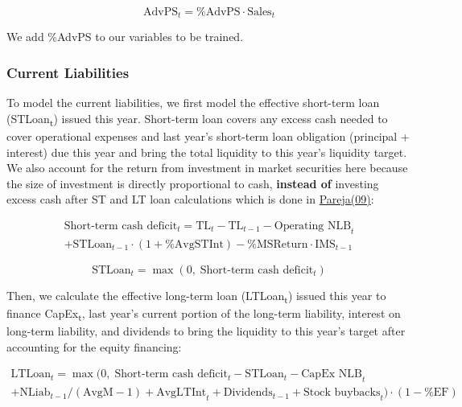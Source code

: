 \documentclass[12pt,a4paper]{article}
\begin{document}
\begin{equation}\label{eq:advps}
\text{AdvPS}_t = \text{\%AdvPS} \cdot \text{Sales}_t
\end{equation}

We add \%AdvPS to our variables to be trained.

\subsubsection{Current Liabilities}

To model the current liabilities, we first model the effective
short-term loan (STLoan\textsubscript{t}) issued this year. Short-term
loan covers any excess cash needed to cover operational expenses and
last year's short-term loan obligation (principal + interest) due this
year and bring the total liquidity to this year's liquidity target. We
also account for the return from investment in market securities here
because the size of investment is directly proportional to cash,
\textbf{instead of} investing excess cash after ST and LT loan
calculations which is done in \hyperlink{ref:pareja09}{Pareja(09)}:

\begin{multline}\label{eq:st_cash_deficit}
\text{Short-term cash deficit}_t = \text{TL}_t - \text{TL}_{t-1} - \text{Operating NLB}_t \\
+ \text{STLoan}_{t-1} \cdot (1 + \text{\%AvgSTInt}) - \text{\%MSReturn} \cdot \text{IMS}_{t-1}
\end{multline}

\begin{equation}\label{eq:stloan}
\text{STLoan}_t = \max(0,\; \text{Short-term cash deficit}_t)
\end{equation}

Then, we calculate the effective long-term loan
(LTLoan\textsubscript{t}) issued this year to finance
CapEx\textsubscript{t}, last year's current portion of the long-term
liability, interest on long-term liability, and dividends to bring the
liquidity to this year's target after accounting for the equity
financing:

\begin{multline}\label{eq:ltloan}
\text{LTLoan}_t = \max(0,\; \text{Short-term cash deficit}_t - \text{STLoan}_t - \text{CapEx NLB}_t \\
+ \text{NLiab}_{t-1} / (\text{AvgM} - 1) + \text{AvgLTInt}_t + \text{Dividends}_{t-1} + \text{Stock buybacks}_t) \cdot (1 - \text{\%EF})
\end{multline}
\end{document}
